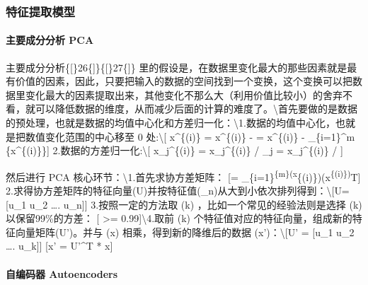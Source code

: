 \subsubsection{特征提取模型}\label{ux7279ux5f81ux63d0ux53d6ux6a21ux578b}

\paragraph{主要成分分析
PCA}\label{ux4e3bux8981ux6210ux5206ux5206ux6790-pca}

主要成分分析\{{[}\}26\{{]}\}\{{[}\}27\{{]}\}
里的假设是，在数据里变化最大的那些因素就是最有价值的因素，因此，只要把输入的数据的空间找到一个变换，这个变换可以把数据里变化最大的因素提取出来，其他变化不那么大（利用价值比较小）的舍弃不看，就可以降低数据的维度，从而减少后面的计算的难度了。\textbackslash{}首先要做的是数据的预处理，也就是数据的均值中心化和方差归一化：\textbackslash{}1.数据的均值中心化，也就是把数值变化范围的中心移至
0 处:\textbackslash{}{[} x\^{}\{(i)\} = x\^{}\{(i)\} - \mu =
x\^{}\{(i)\} -  \sum\_\{i=1\}\^{}m \{x\^{}\{(i)\}\}{]}
2.数据的方差归一化:\textbackslash{}{[} x\_j\^{}\{(i)\} = x\_j\^{}\{(i)\}
/ \sigma\_j = x\_j\^{}\{(i)\} /
 {]}

然后进行 PCA 核心环节：\textbackslash{}1.首先求协方差矩阵： {[}\sum =
\sum\_\{i=1\}\textsuperscript{\{m\}(x}\{(i)\})(x\textsuperscript{\{(i)\})}T{]}
2.求得协方差矩阵的特征向量(U)并按特征值(\lambda\_n)从大到小依次排列得到：\textbackslash{}{[}U={[}u\_1
u\_2 \ldots{}. u\_n{]}{]} 3.按照一定的方法取 (k)
，比如一个常见的经验法则是选择 (k) 以保留99\%的方差：
{[}
\textgreater{}= 0.99{]}\textbackslash{}4.取前 (k)
个特征值对应的特征向量，组成新的特征向量矩阵(U')。并与 (x)
相乘，得到新的降维后的数据 (x')：\textbackslash{}{[}U' = {[}u\_1 u\_2
\ldots{}. u\_k{]}{]} {[}x' = U'\^{}T * x{]}

\paragraph{自编码器
Autoencoders}\label{ux81eaux7f16ux7801ux5668-autoencoders}

